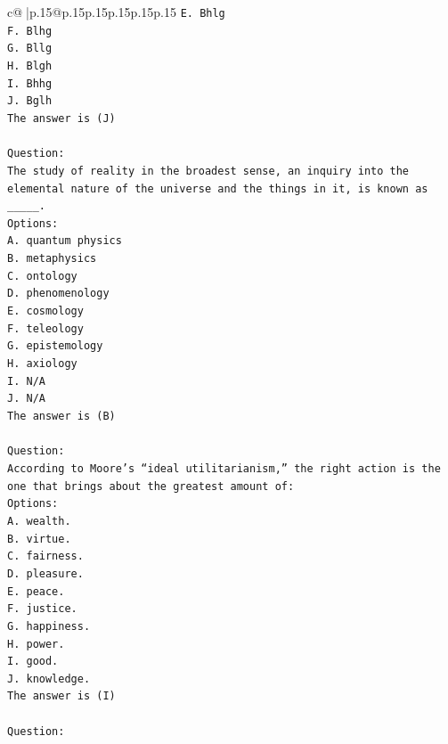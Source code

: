 \documentclass{article}
\begin{document}
{\begin{supertabular}{c@{$\;$}|p{.15\linewidth}@{}p{.15\linewidth}p{.15\linewidth}p{.15\linewidth}p{.15\linewidth}p{.15\linewidth}}
{{{\texttt{E. Bhlg} \\
\texttt{F. Blhg} \\
\texttt{G. Bllg} \\
\texttt{H. Blgh} \\
\texttt{I. Bhhg} \\
\texttt{J. Bglh} \\
\texttt{The answer is (J)} \\
\\ 
\texttt{Question:} \\
\texttt{The study of reality in the broadest sense, an inquiry into the elemental nature of the universe and the things in it, is known as \_\_\_\_\_.} \\
\texttt{Options:} \\
\texttt{A. quantum physics} \\
\texttt{B. metaphysics} \\
\texttt{C. ontology} \\
\texttt{D. phenomenology} \\
\texttt{E. cosmology} \\
\texttt{F. teleology} \\
\texttt{G. epistemology} \\
\texttt{H. axiology} \\
\texttt{I. N/A} \\
\texttt{J. N/A} \\
\texttt{The answer is (B)} \\
\\ 
\texttt{Question:} \\
\texttt{According to Moore’s “ideal utilitarianism,” the right action is the one that brings about the greatest amount of:} \\
\texttt{Options:} \\
\texttt{A. wealth.} \\
\texttt{B. virtue.} \\
\texttt{C. fairness.} \\
\texttt{D. pleasure.} \\
\texttt{E. peace.} \\
\texttt{F. justice.} \\
\texttt{G. happiness.} \\
\texttt{H. power.} \\
\texttt{I. good.} \\
\texttt{J. knowledge.} \\
\texttt{The answer is (I)} \\
\\ 
\texttt{Question:} \\
}}}
\end{supertabular}}
\end{document}
